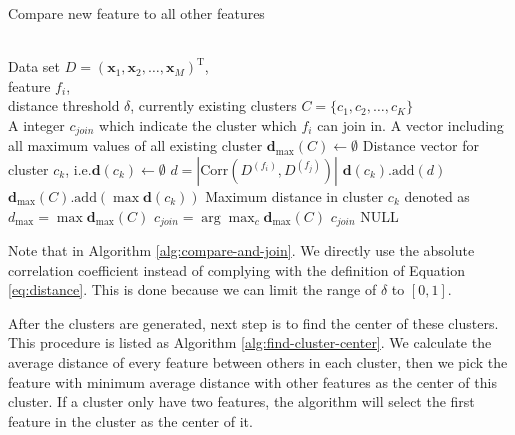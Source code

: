 \documentclass{ieeeaccess}
\theoremstyle{definition}
\begin{document}
\begin{algorithm}
\caption{Compare new feature to all other features}
\label{alg:compare-and-join}
\begin{algorithmic}[1]
\REQUIRE ~~\\
    Data set $D=(\bm{x}_1,\bm{x}_2,\ldots,\bm{x}_M)^\text{T}$, \\
    feature $f_i$, \\
    distance threshold $\delta$,
    currently existing clusters $C=\{c_1, c_2, \ldots, c_K\}$
\ENSURE ~~\\
    A integer $c_{join}$ which indicate the cluster which $f_i$ can join in.
\STATE A vector including all maximum values of all existing cluster $\bm{d}_{\max}(C) \gets \emptyset$
    \STATE Distance vector for cluster $c_k$, i.e.$\bm{d}(c_k) \gets \emptyset$
        \STATE $d=|\text{Corr}(D^{(f_i)}, D^{(f_j)})|$
        \STATE $\bm{d}(c_k)\text{.add}(d)$
    \ENDFOR
    \STATE $\bm{d}_{\max}(C)\text{.add}(\max{\bm{d}(c_k)})$
\ENDFOR
\STATE Maximum distance in cluster $c_k$ denoted as $d_{\max}=\max{\bm{d}_{\max}(C)}$
    \STATE $c_{join}=\arg\max_c{\bm{d}_{\max}(C)}$
    \RETURN $c_{join}$
\ELSE
    \RETURN NULL
\ENDIF
\end{algorithmic}
\end{algorithm}

Note that in Algorithm \ref{alg:compare-and-join}. We directly use the absolute correlation coefficient instead of complying with the definition of Equation \ref{eq:distance}. This is done because we can limit the range of $\delta$ to $[0,1]$.

After the clusters are generated, next step is to find the center of these clusters. This procedure is listed as Algorithm \ref{alg:find-cluster-center}. We calculate the average distance of every feature between others in each cluster, then we pick the feature with minimum average distance with other features as the center of this cluster. If a cluster only have two features, the algorithm will select the first feature in the cluster as the center of it.
\end{document}
